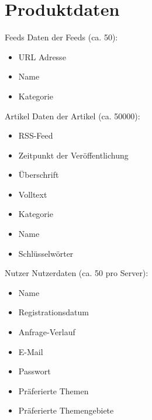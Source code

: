 
\chapter{Produktdaten}

\begin{data}{10}{Feeds}	Daten der Feeds (ca. 50):
	\begin{itemize}
	  \item URL Adresse
	  \item Name
	  \item Kategorie
	\end{itemize}
\end{data}

\begin{data}{20}{Artikel}
	Daten der Artikel (ca. 50000):
	\begin{itemize}
	  \item RSS-Feed
	  \item Zeitpunkt der Veröffentlichung
	  \item Überschrift
	  \item Volltext
    \item Kategorie
	  \item Name
	  \item Schlüsselwörter
	\end{itemize}
\end{data}

\begin{data}{30}{Nutzer}
	Nutzerdaten (ca. 50 pro Server):
	\begin{itemize}
	  \item Name
	  \item Registrationsdatum
	  \item Anfrage-Verlauf
	  \item E-Mail
	  \item Passwort
	  \item Präferierte Themen
	  \item Präferierte Themengebiete
	\end{itemize}
\end{data}
